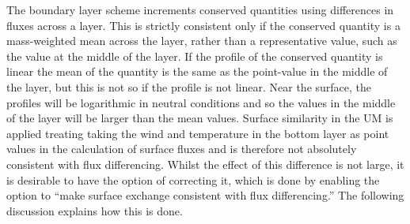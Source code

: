 \documentclass{UMDP_article}
\begin{document}
The boundary layer scheme increments conserved quantities using
differences in fluxes across a layer. This is strictly consistent only
if the conserved quantity is a mass-weighted mean across the layer,
rather than a representative value, such as the value at the middle of
the layer. If the profile of the conserved quantity is linear the mean
of the quantity is the same as the point-value in the middle of the
layer, but this is not so if the profile is not linear. Near the
surface, the profiles will be logarithmic in neutral conditions and so
the values in the middle of the layer will be larger than the mean
values. Surface similarity in the UM is applied treating taking the
wind and temperature in the bottom layer as point values in the
calculation of surface fluxes and is therefore not absolutely
consistent with flux differencing.  Whilst the effect of this
difference is not large, it is desirable to have the option of
correcting it, which is done by enabling the option to ``make surface
exchange consistent with flux differencing.''  The following
discussion explains how this is done.
\end{document}
